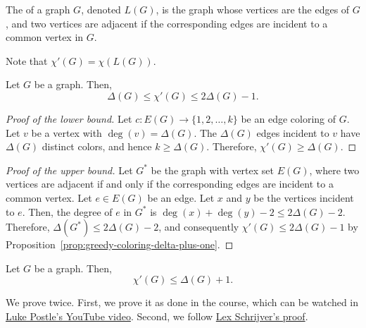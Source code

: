 \begin{definition}
    The  of a graph \(G\), denoted \(L(G)\), is the graph whose vertices are the edges of \(G\), and two vertices are adjacent if the corresponding edges are incident to a common vertex in \(G\).
\end{definition}

Note that \(\chi'(G) = \chi(L(G))\).

\begin{proposition} \label{prop:easy-bounds-edge-coloring}
    Let \(G\) be a graph.
    Then,
    \begin{equation}
        \Delta(G) \leq \chi'(G) \leq 2\Delta(G) - 1.
    \end{equation}
\end{proposition}

\begin{proof}[Proof of the lower bound]
    Let \(c \colon E(G) \to \{1, 2, \ldots, k\}\) be an edge coloring of \(G\).
    Let \(v\) be a vertex with \(\deg(v) = \Delta(G)\).
    The \(\Delta(G)\) edges incident to \(v\) have \(\Delta(G)\) distinct colors,
    and hence \(k \geq \Delta(G)\).
    Therefore, \(\chi'(G) \geq \Delta(G)\).
\end{proof}

\begin{proof}[Proof of the upper bound]
    Let \(G^*\) be the graph with vertex set \(E(G)\),
    where two vertices are adjacent if and only if the corresponding edges are incident to a common vertex.
    Let \(e \in E(G)\) be an edge.
    Let \(x\) and \(y\) be the vertices incident to \(e\).
    Then, the degree of \(e\) in \(G^*\) is \(\deg(x) + \deg(y) - 2 \leq 2\Delta(G) - 2\).
    Therefore, \(\Delta(G^*) \leq 2\Delta(G) - 2\),
    and consequently \(\chi'(G) \leq 2\Delta(G) - 1\) by Proposition~\ref{prop:greedy-coloring-delta-plus-one}.
\end{proof}

\begin{theorem} \label{thm:vizing}
    Let \(G\) be a graph.
    Then,
    \begin{equation}
        \chi'(G) \leq \Delta(G) + 1.
    \end{equation}
\end{theorem}

We prove  twice.
First, we prove it as done in the course, which can be watched in \href{https://youtu.be/9t76UcdgiGI}{Luke Postle's YouTube video}.
Second, we follow \href{https://homepages.cwi.nl/~lex/files/vizing.pdf}{Lex Schrijver's proof}.

